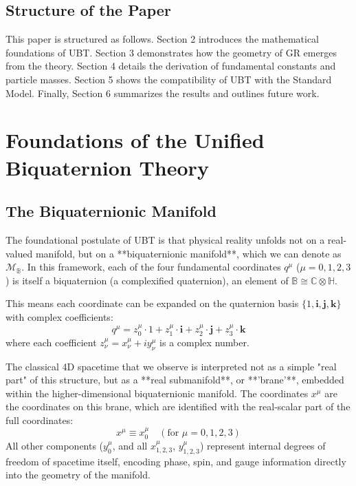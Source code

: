 \documentclass[12pt, a4paper]{article}
\begin{document}
\subsection{Structure of the Paper}
This paper is structured as follows. Section 2 introduces the mathematical foundations of UBT. Section 3 demonstrates how the geometry of GR emerges from the theory. Section 4 details the derivation of fundamental constants and particle masses. Section 5 shows the compatibility of UBT with the Standard Model. Finally, Section 6 summarizes the results and outlines future work.

\section{Foundations of the Unified Biquaternion Theory}

\subsection{The Biquaternionic Manifold}
The foundational postulate of UBT is that physical reality unfolds not on a real-valued manifold, but on a **biquaternionic manifold**, which we can denote as \( \mathcal{M}_{\mathbb{B}} \). In this framework, each of the four fundamental coordinates \(q^\mu\) (\(\mu=0,1,2,3\)) is itself a biquaternion (a complexified quaternion), an element of \( \mathbb{B} \cong \mathbb{C} \otimes \mathbb{H} \).

This means each coordinate can be expanded on the quaternion basis \( \{1, \mathbf{i}, \mathbf{j}, \mathbf{k}\} \) with complex coefficients:
\begin{equation}
    q^\mu = z_0^\mu \cdot 1 + z_1^\mu \cdot \mathbf{i} + z_2^\mu \cdot \mathbf{j} + z_3^\mu \cdot \mathbf{k}
\end{equation}
where each coefficient \( z_\nu^\mu = x_\nu^\mu + i y_\nu^\mu \) is a complex number.

The classical 4D spacetime that we observe is interpreted not as a simple "real part" of this structure, but as a **real submanifold**, or **'brane'**, embedded within the higher-dimensional biquaternionic manifold. The coordinates \(x^\mu\) are the coordinates on this brane, which are identified with the real-scalar part of the full coordinates:
\begin{equation}
    x^\mu \equiv x_0^\mu \quad (\text{for } \mu=0,1,2,3)
\end{equation}
All other components (\(y_0^\mu\), and all \(x_{1,2,3}^\mu\), \(y_{1,2,3}^\mu\)) represent internal degrees of freedom of spacetime itself, encoding phase, spin, and gauge information directly into the geometry of the manifold.
\end{document}
